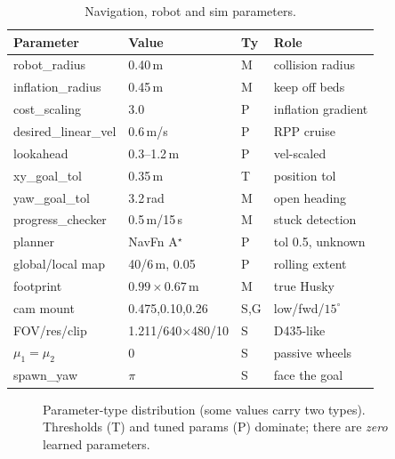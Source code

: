 \documentclass[10pt,journal,twoside]{IEEEtran}
\begin{document}
\begin{table}[!t]
\centering
\caption{Navigation, robot and sim parameters.}
\label{tab:cfg2}
\footnotesize
\begin{tabular}{@{}lll l@{}}
\toprule
\textbf{Parameter} & \textbf{Value} & \textbf{Ty} & \textbf{Role} \\
\midrule
robot\_radius & 0.40\,m & M & collision radius \\
inflation\_radius & 0.45\,m & M & keep off beds \\
cost\_scaling & 3.0 & P & inflation gradient \\
desired\_linear\_vel & 0.6\,m/s & P & RPP cruise \\
lookahead & 0.3--1.2\,m & P & vel-scaled \\
xy\_goal\_tol & 0.35\,m & T & position tol \\
yaw\_goal\_tol & 3.2\,rad & M & open heading \\
progress\_checker & 0.5\,m/15\,s & M & stuck detection \\
planner & NavFn A$^\star$ & P & tol 0.5, unknown \\
global/local map & 40/6\,m, 0.05 & P & rolling extent \\
footprint & $0.99\times0.67$\,m & M & true Husky \\
cam mount & 0.475,0.10,0.26 & S,G & low/fwd/$15^\circ$ \\
FOV/res/clip & 1.211/640$\times$480/10 & S & D435-like \\
$\mu_1{=}\mu_2$ & 0 & S & passive wheels \\
spawn\_yaw & $\pi$ & S & face the goal \\
\bottomrule
\end{tabular}
\end{table}

\begin{figure}[!t]
\centering
{}
\caption{Parameter-type distribution (some values carry two types). Thresholds (T) and tuned params (P) dominate; there are \emph{zero} learned parameters.}
\label{fig:types}
\end{figure}
\end{document}
